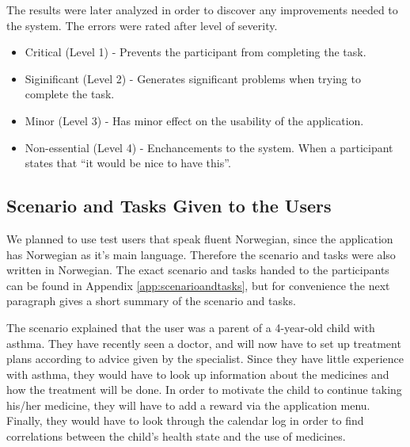 The results were later analyzed in order to discover any improvements needed to the system. The errors were rated after level of severity\cite{dumas1995practical}. 

\begin{itemize}
\item{Critical (Level 1) - Prevents the participant from completing the task.}
\item{Siginificant (Level 2) - Generates significant problems when trying to complete the task.}
\item{Minor (Level 3) - Has minor effect on the usability of the application.}
\item{Non-essential (Level 4) - Enchancements to the system. When a participant states that ``it would be nice to have this''.}
\end{itemize}



\subsection{Scenario and Tasks Given to the Users}
\label{sec:scenarioandtasksgiventotheusers}
We planned to use test users that speak fluent Norwegian, since the application has Norwegian as it's main language. Therefore the scenario and tasks were also written in Norwegian. The exact scenario and tasks handed to the participants can be found in Appendix \ref{app:scenarioandtasks}, but for convenience the next paragraph gives a short summary of the scenario and tasks.

The scenario explained that the user was a parent of a 4-year-old child with asthma. They have recently seen a doctor, and will now have to set up treatment plans according to advice given by the specialist. Since they have little experience with asthma, they would have to look up information about the medicines and how the treatment will be done. In order to motivate the child to continue taking his/her medicine, they will have to add a reward via the application menu. Finally, they would have to look through the calendar log in order to find correlations between the child's health state and the use of medicines. 
